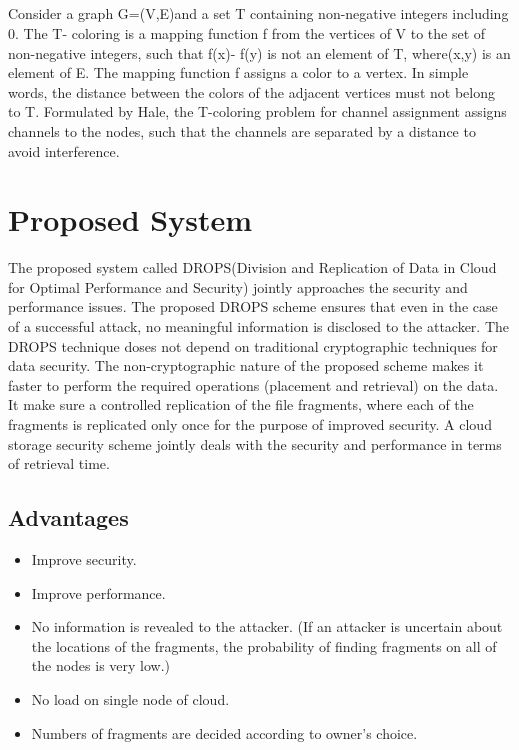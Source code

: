 \paragraph{}
Consider a graph G=(V,E)and a set T containing non-negative integers including 0.
The T- coloring is a mapping function f from the vertices of V to the set of non-negative
integers, such that f(x)- f(y) is not an element of T, where(x,y) is an element of E. The
mapping function f assigns a color to a vertex. In simple words, the distance between the
colors of the adjacent vertices must not belong to T. Formulated by Hale, the T-coloring
problem for channel assignment assigns channels to the nodes, such that the channels are
separated by a distance to avoid interference.

\chapter{Proposed System}
The proposed system called DROPS(Division and Replication of Data in Cloud for Optimal Performance and Security) jointly approaches the security and performance issues. The proposed DROPS scheme ensures that even in the case of a successful attack, no meaningful information is disclosed to the attacker. The DROPS technique doses not depend on traditional cryptographic techniques for data security. The non-cryptographic nature of the proposed scheme makes it faster to perform the required operations (placement and retrieval) on the data. It make sure a controlled replication of the file fragments,
where each of the fragments is replicated only once for the purpose of improved security.
A cloud storage security scheme jointly deals with the security and performance in terms
of retrieval time.
\section{Advantages}
\begin{itemize}
	\item  Improve security.
	\item  Improve performance. 
	\item  No information is revealed to the attacker. (If an attacker is uncertain about the locations of the fragments, the probability of finding fragments on all of the nodes is very low.)
	\item  No load on single node of cloud.
	\item  Numbers of fragments are decided according to owner’s choice.
\end{itemize}
